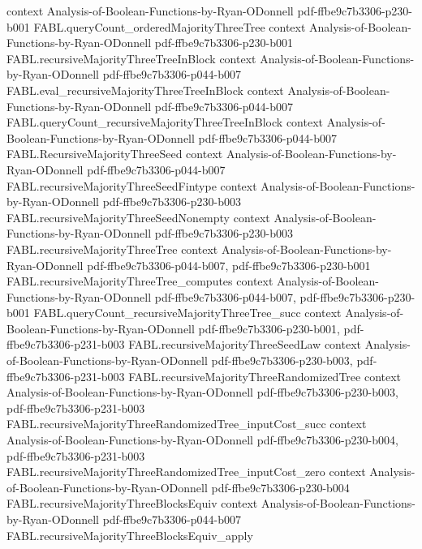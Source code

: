 \begin{theorem}
  {context}
  {Analysis-of-Boolean-Functions-by-Ryan-ODonnell}
  {pdf-ffbe9c7b3306-p230-b001}
\proofstep
  {FABL.queryCount_orderedMajorityThreeTree}
  {context}
  {Analysis-of-Boolean-Functions-by-Ryan-ODonnell}
  {pdf-ffbe9c7b3306-p230-b001}
\proofstep
  {FABL.recursiveMajorityThreeTreeInBlock}
  {context}
  {Analysis-of-Boolean-Functions-by-Ryan-ODonnell}
  {pdf-ffbe9c7b3306-p044-b007}
\proofstep
  {FABL.eval_recursiveMajorityThreeTreeInBlock}
  {context}
  {Analysis-of-Boolean-Functions-by-Ryan-ODonnell}
  {pdf-ffbe9c7b3306-p044-b007}
\proofstep
  {FABL.queryCount_recursiveMajorityThreeTreeInBlock}
  {context}
  {Analysis-of-Boolean-Functions-by-Ryan-ODonnell}
  {pdf-ffbe9c7b3306-p044-b007}
\proofstep
  {FABL.RecursiveMajorityThreeSeed}
  {context}
  {Analysis-of-Boolean-Functions-by-Ryan-ODonnell}
  {pdf-ffbe9c7b3306-p044-b007}
\proofstep
  {FABL.recursiveMajorityThreeSeedFintype}
  {context}
  {Analysis-of-Boolean-Functions-by-Ryan-ODonnell}
  {pdf-ffbe9c7b3306-p230-b003}
\proofstep
  {FABL.recursiveMajorityThreeSeedNonempty}
  {context}
  {Analysis-of-Boolean-Functions-by-Ryan-ODonnell}
  {pdf-ffbe9c7b3306-p230-b003}
\proofstep
  {FABL.recursiveMajorityThreeTree}
  {context}
  {Analysis-of-Boolean-Functions-by-Ryan-ODonnell}
  {pdf-ffbe9c7b3306-p044-b007,
    pdf-ffbe9c7b3306-p230-b001}
\proofstep
  {FABL.recursiveMajorityThreeTree_computes}
  {context}
  {Analysis-of-Boolean-Functions-by-Ryan-ODonnell}
  {pdf-ffbe9c7b3306-p044-b007,
    pdf-ffbe9c7b3306-p230-b001}
\proofstep
  {FABL.queryCount_recursiveMajorityThreeTree_succ}
  {context}
  {Analysis-of-Boolean-Functions-by-Ryan-ODonnell}
  {pdf-ffbe9c7b3306-p230-b001,
    pdf-ffbe9c7b3306-p231-b003}
\proofstep
  {FABL.recursiveMajorityThreeSeedLaw}
  {context}
  {Analysis-of-Boolean-Functions-by-Ryan-ODonnell}
  {pdf-ffbe9c7b3306-p230-b003,
    pdf-ffbe9c7b3306-p231-b003}
\proofstep
  {FABL.recursiveMajorityThreeRandomizedTree}
  {context}
  {Analysis-of-Boolean-Functions-by-Ryan-ODonnell}
  {pdf-ffbe9c7b3306-p230-b003,
    pdf-ffbe9c7b3306-p231-b003}
\proofstep
  {FABL.recursiveMajorityThreeRandomizedTree_inputCost_succ}
  {context}
  {Analysis-of-Boolean-Functions-by-Ryan-ODonnell}
  {pdf-ffbe9c7b3306-p230-b004,
    pdf-ffbe9c7b3306-p231-b003}
\proofstep
  {FABL.recursiveMajorityThreeRandomizedTree_inputCost_zero}
  {context}
  {Analysis-of-Boolean-Functions-by-Ryan-ODonnell}
  {pdf-ffbe9c7b3306-p230-b004}
\proofstep
  {FABL.recursiveMajorityThreeBlocksEquiv}
  {context}
  {Analysis-of-Boolean-Functions-by-Ryan-ODonnell}
  {pdf-ffbe9c7b3306-p044-b007}
\proofstep
  {FABL.recursiveMajorityThreeBlocksEquiv_apply}

\end{theorem}
